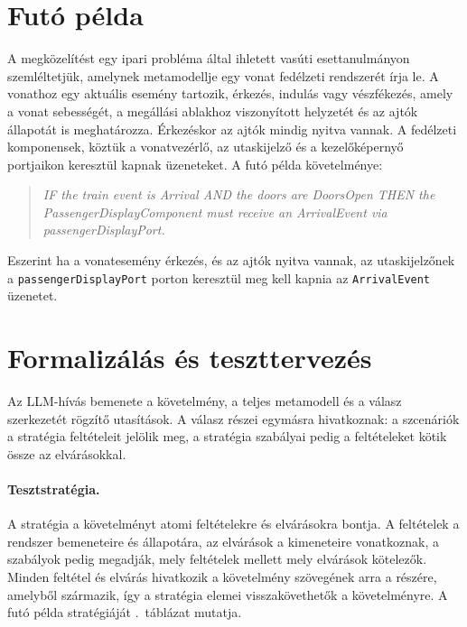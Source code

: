 \section{Futó példa}
\label{sec:overview-example}

A megközelítést egy ipari probléma által ihletett vasúti esettanulmányon szemléltetjük, amelynek metamodellje egy vonat fedélzeti rendszerét írja le. 
A vonathoz egy aktuális esemény tartozik, érkezés, indulás vagy vészfékezés, amely a vonat sebességét, a megállási ablakhoz viszonyított helyzetét és 
az ajtók állapotát is meghatározza. Érkezéskor az ajtók mindig nyitva vannak. A fedélzeti komponensek, köztük a vonatvezérlő, az utaskijelző és a kezelőképernyő  
portjaikon keresztül kapnak üzeneteket. A futó példa követelménye:
\begin{quote}
	\emph{IF the train event is Arrival AND the doors are DoorsOpen THEN the PassengerDisplayComponent must receive an ArrivalEvent via passengerDisplayPort.}
\end{quote}
Eszerint ha a vonatesemény érkezés, és az ajtók nyitva vannak, az utaskijelzőnek a \texttt{passengerDisplayPort} porton keresztül meg kell kapnia az \texttt{ArrivalEvent} üzenetet.


\section{Formalizálás és teszttervezés}
\label{sec:overview-llm}

Az  LLM-hívás bemenete a követelmény, a teljes metamodell és a válasz szerkezetét rögzítő utasítások. A válasz részei egymásra hivatkoznak: a szcenáriók a stratégia feltételeit jelölik meg, a stratégia szabályai pedig a feltételeket kötik össze az elvárásokkal.

\paragraph{Tesztstratégia.} A stratégia a követelményt atomi feltételekre és elvárásokra bontja. A feltételek a rendszer bemeneteire és állapotára, az elvárások a kimeneteire vonatkoznak, a szabályok pedig megadják, mely feltételek mellett mely elvárások kötelezők. Minden feltétel és elvárás hivatkozik a követelmény szövegének arra a részére, amelyből származik, így a stratégia elemei visszakövethetők a követelményre. A futó példa stratégiáját .~táblázat mutatja.

